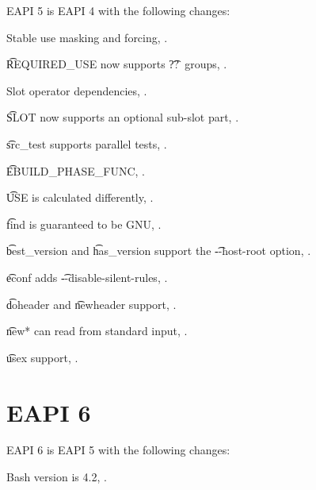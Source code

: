 EAPI 5 is EAPI 4 with the following changes:

\begin{compactitem}
\item Stable use masking and forcing, .
\item \t{REQUIRED\_USE} now supports \t{??}\ groups, .
\item Slot operator dependencies, .
\item \t{SLOT} now supports an optional sub-slot part, .
\item \t{src\_test} supports parallel tests, .
\item \t{EBUILD\_PHASE\_FUNC}, .
\item \t{USE} is calculated differently, .
\item \t{find} is guaranteed to be GNU, .
\item \t{best\_version} and \t{has\_version} support the \t{-{}-host-root} option,
    .
\item \t{econf} adds \t{-{}-disable-silent-rules}, .
\item \t{doheader} and \t{newheader} support, .
\item \t{new*} can read from standard input, .
\item \t{usex} support, .
\end{compactitem}

\section*{EAPI 6}

EAPI 6 is EAPI 5 with the following changes:

\begin{compactitem}
\item Bash version is 4.2, .
\end{compactitem}



